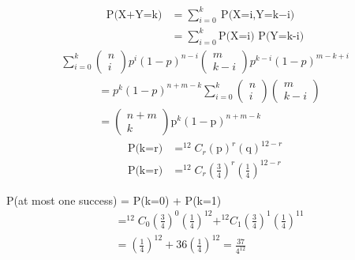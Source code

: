 \documentclass[journal,12pt,twocolumn]{IEEEtran}
\begin{document}
\begin{align}
\text{P(X+Y=k)} &= \sum_{i=0}^{k}\text{P(X=i,Y=k$-$i)}\\
&=\sum_{i=0}^{k}\text{P(X=i) P(Y=k-i)}
\end{align}
\begin{align}
\sum_{i=0}^{k}\left(\begin{array}{ll}
    n\\
    i
    \end{array}\right){p}^i(1-p)^{n-i} \left(\begin{array}{ll}
    m\\
    k-i
    \end{array}\right)p^{k-i}(1-p)^{m-k+i}
\end{align}
\begin{align}
    &= p^k(1-p)^{n+m-k}\sum_{i=0}^{k}\left(\begin{array}{cc}
    n\\
    i
    \end{array}\right)\left(\begin{array}{ll}
    m\\
    k-i
    \end{array}\right)\\
&= \left(\begin{array}{cc}
    n+m\\
    k
    \end{array}\right) \text{p}^k \left(1-\text{p}\right)^{n+m-k}
\end{align}
\begin{align}
\text{P(k=r)} &= ^{12}C_r (\text{p})^r (\text{q})^{12-r}\\
\text{P(k=r)} &= ^{12}C_r \left(\frac{3}{4}\right)^r \left(\frac{1}{4}\right)^{12-r}
\end{align}

\begin{center}
\end{center}
P(at most one success) = P(k=0) + P(k=1)
\begin{align}
&= ^{12}C_0 \left({\frac{3}{4}}\right)^0 \left(\frac{1}{4}\right)^{12} + ^{12}C_1 \left(\frac{3}{4}\right)^1 \left(\frac{1}{4}\right)^{11} 
\\
&= \left(\frac{1}{4}\right)^{12} + 36\left(\frac{1}{4}\right)^{12} =  \frac{37}{4^{12}}
\end{align}
\end{document}
